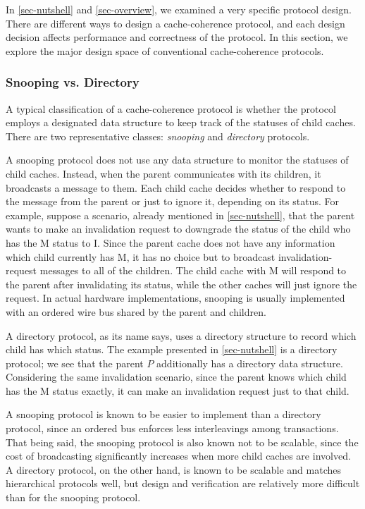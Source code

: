 In \autoref{sec-nutshell} and \autoref{sec-overview}, we examined a very specific protocol design.
There are different ways to design a cache-coherence protocol, and each design decision affects performance and correctness of the protocol.
In this section, we explore the major design space of conventional cache-coherence protocols.

\subsubsection{Snooping vs. Directory}

A typical classification of a cache-coherence protocol is whether the protocol employs a designated data structure to keep track of the statuses of child caches.
There are two representative classes: \emph{snooping} and \emph{directory} protocols.

A snooping protocol does not use any data structure to monitor the statuses of child caches.
Instead, when the parent communicates with its children, it broadcasts a message to them.
Each child cache decides whether to respond to the message from the parent or just to ignore it, depending on its status.
For example, suppose a scenario, already mentioned in \autoref{sec-nutshell}, that the parent wants to make an invalidation request to downgrade the status of the child who has the M status to I.
Since the parent cache does not have any information which child currently has M, it has no choice but to broadcast invalidation-request messages to all of the children.
The child cache with M will respond to the parent after invalidating its status, while the other caches will just ignore the request.
In actual hardware implementations, snooping is usually implemented with an ordered wire bus shared by the parent and children.

A directory protocol, as its name says, uses a directory structure to record which child has which status.
The example presented in \autoref{sec-nutshell} is a directory protocol; we see that the parent $P$ additionally has a directory data structure.
Considering the same invalidation scenario, since the parent knows which child has the M status exactly, it can make an invalidation request just to that child.

A snooping protocol is known to be easier to implement than a directory protocol, since an ordered bus enforces less interleavings among transactions.
That being said, the snooping protocol is also known not to be scalable, since the cost of broadcasting significantly increases when more child caches are involved.
A directory protocol, on the other hand, is known to be scalable and matches hierarchical protocols well, but design and verification are relatively more difficult than for the snooping protocol.

